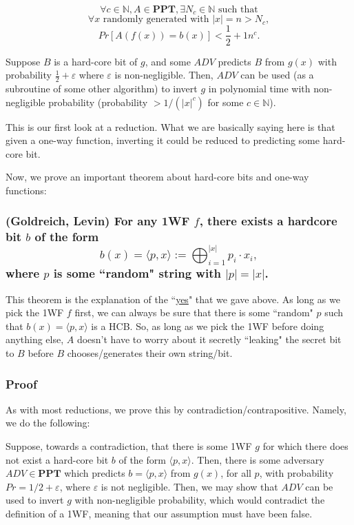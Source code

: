 \documentclass[11pt]{article}
\newcommand{\N}{\mathbb{N}}
\begin{document}
\[\forall c\in\N, A\in\mathbf{PPT}, \exists N_c\in\N\text{ such that}\]
\[\forall x\text{ randomly generated with }|x|=n>N_c,\]
\[Pr[A(f(x))=b(x)]<\frac{1}{2}+{1}{n^c}.\]

Suppose \(B\) is a hard-core bit of \(g\), and some \(ADV\) predicts \(B\) from \(g(x)\) with probability \(\frac{1}{2}+\varepsilon\) where \(\varepsilon\) is non-negligible. Then, \(ADV\) can be used (as a subroutine of some other algorithm) to invert \(g\) in polynomial time with non-negligible probability (probability \(>1/(|x|^c)\) for some \(c\in\N\)).

This is our first look at a reduction. What we are basically saying here is that given a one-way function, inverting it could be reduced to predicting some hard-core bit.\bigskip

Now, we prove an important theorem about hard-core bits and one-way functions:

\subsubsection{(Goldreich, Levin) For any 1WF \(f\), there exists a hardcore bit \(b\) of the form \[b(x)=\langle p,x\rangle := \bigoplus_{i=1}^{|x|}p_i\cdot x_i,\] where \(p\) is some ``random" string with \(|p|=|x|\).}

This theorem is the explanation of the ``\underline{yes}" that we gave above. As long as we pick the 1WF \(f\) first, we can always be sure that there is some ``random" \(p\) such that \(b(x)=\langle p,x\rangle\) is a HCB. So, as long as we pick the 1WF before doing anything else, \(A\) doesn't have to worry about it secretly ``leaking" the secret bit to \(B\) before \(B\) chooses/generates their own string/bit.

\subsubsection{Proof}

As with most reductions, we prove this by contradiction/contrapositive. Namely, we do the following:

Suppose, towards a contradiction, that there is some 1WF \(g\) for which there does not exist a hard-core bit \(b\) of the form \(\langle p,x\rangle\). Then, there is some adversary \(ADV\in \mathbf{PPT}\) which predicts \(b=\langle p,x\rangle\) from \(g(x)\), for all \(p\), with probability \(Pr=1/2+\varepsilon\), where \(\varepsilon\) is not negligible. Then, we may show that  \(ADV\) can be used to invert \(g\) with non-negligible probability, which would contradict the definition of a 1WF, meaning that our assumption must have been false.\bigskip
\end{document}
